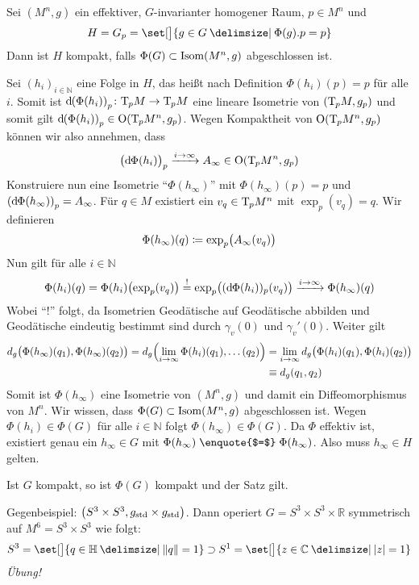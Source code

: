 \begin{lemma}[{name=[Kompaktheit der Standgruppe]},label=lem:319]
	Sei $(M^n,g)$ ein effektiver, $G$-invarianter homogener Raum, $p \in M^n$ und 
	\[
		H = G_p = \set[\big]{g \in G \given \Phi(g) .p = p}
	\]
	Dann ist $H$ kompakt, falls $\Phi(G) \subset \Isom(M^n,g)$ abgeschlossen ist.
\end{lemma}
\begin{beweis}
	Sei $(h_i)_{i \in \mathbb{N}}$ eine Folge in $H$, das heißt nach Definition $\Phi(h_i)(p)=p$ für alle $i$.
	Somit ist $\mathd \enbrace*{\Phi(h_i)}_p \colon \Tmap_p M \to \Tmap_p M$ eine lineare Isometrie von $(\Tmap_p M, g_p)$ und somit gilt $\mathd  \enbrace*{\Phi(h_i)}_p \in \On \enbrace*{\Tmap_p M^n,g_p}$.
	Wegen Kompaktheit von $\On \enbrace*{\Tmap_p M^n,g_p}$ können wir also annehmen, dass
	\[
		\enbrace[\big]{\mathd\Phi(h_i)}_p \grenzw{i \to \infty} A_\infty \in \On \enbrace*{\Tmap_p M^n,g_p}
	\]
	Konstruiere nun eine Isometrie \enquote{$\Phi(h_\infty)$} mit $\Phi(h_\infty)(p)=p$ und $\enbrace*{\mathd\Phi(h_\infty)}_p = A_\infty$.
	Für $q \in M$ existiert ein $v_q \in \Tmap_p M^n$ mit $\exp_p(v_q) =q$.
	Wir definieren
	\[
		\Phi(h_\infty)(q) \coloneqq \exp_p \enbrace[\big]{A_\infty(v_q)}
	\]
	Nun gilt für alle $i \in \mathbb{N}$ 
	\[
		\Phi(h_i)(q) = \Phi(h_i) \enbrace[\big]{\exp_p(v_q)} \stackrel{!}{=} \exp_p \enbrace[\big]{ (\mathd \Phi(h_i))_p (v_q)} \grenzw{i \to \infty} \Phi(h_\infty)(q)
	\]
	Wobei \enquote{!} folgt, da Isometrien Geodätische auf Geodätische abbilden und Geodätische eindeutig bestimmt  sind durch $\gamma_v(0)$ und $\gamma_v'(0)$.
	Weiter gilt
	\begin{align}
		d_g \enbrace[\big]{\Phi(h_\infty)(q_1), \Phi(h_\infty)(q_2)} = d_g \enbrace*{\lim_{i \to \infty} \Phi(h_i)(q_1), \ldots (q_2)} &= \lim_{i \to \infty} d_g \enbrace[\big]{\Phi(h_i)(q_1), \Phi(h_i)(q_2)} \\
		&\equiv d_g(q_1,q_2)
	\end{align}
	Somit ist $\Phi(h_\infty)$ eine Isometrie von $(M^n,g)$ und damit ein Diffeomorphismus von $M^n$.
	Wir wissen, dass $\Phi(G) \subset \Isom(M^n,g)$ abgeschlossen ist.
	Wegen $\Phi(h_i) \in \Phi(G)$ für alle $i \in \mathbb{N}$ folgt $\Phi(h_\infty) \in \Phi(G)$.
	Da $\Phi$ effektiv ist, existiert genau ein $h_\infty \in G$ mit $\Phi(h_\infty) \mathrel{\text{\enquote{$=$}}} \Phi(h_\infty)$.
	Also muss $h_\infty \in H$ gelten.
\end{beweis}

\begin{beispiel*}[{name=[Gültigkeit von \autoref{lem:319}]}]
	Ist $G$ kompakt, so ist $\Phi(G)$ kompakt und der Satz gilt.
	
	Gegenbeispiel: $\enbrace*{S^3 \times S^3, g_{\mathrm{std}} \times g_{\mathrm{std}}}$. Dann operiert $G = S^3 \times S^3 \times \mathbb{R}$ symmetrisch auf $M^6=S^3 \times S^3$ wie folgt:
	\[
		S^3 = \set[\big]{q \in \mathbb{H} \given \norm*{q}=1} \supset S^1 = \set[\big]{z \in \mathbb{C} \given \abs*{z}=1 }
	\]
	\emph{Übung!}
\end{beispiel*}


